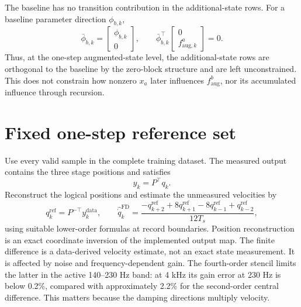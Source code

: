 \documentclass[11pt,a4paper]{article}
\begin{document}
The baseline has no transition contribution in the additional-state rows.
For a baseline parameter direction \(\phi_{b,k}\),
\begin{equation}
    \bar\phi_{b,k}=\begin{bmatrix}\phi_{b,k}\\0\end{bmatrix},
    \qquad
    \bar\phi_{b,k}^{\top}
    \begin{bmatrix}0\\f_{\mathrm{aug},k}^a\end{bmatrix}=0.
    \label{eq:zero-block}
\end{equation}
Thus, at the one-step augmented-state level, the additional-state rows are
orthogonal to the baseline by the zero-block structure and are left
unconstrained. This does not constrain how nonzero \(x_a\) later influences
\(f_{\mathrm{aug}}^b\), nor its accumulated influence through recursion.

\section{Fixed one-step reference set}
\label{sec:fixed-reference-set}

Use every valid sample in the complete training dataset. The measured output
contains the three stage positions and satisfies
\begin{equation}
    y_k=P^\top q_k.
\end{equation}
Reconstruct the logical positions and estimate the unmeasured velocities by
\begin{equation}
    q_k^{\mathrm{ref}}=P^{-\top}y_k^{\mathrm{data}},
    \qquad
    \widehat{\dot q}_k^{\mathrm{FD}}
    =\frac{-q_{k+2}^{\mathrm{ref}}+8q_{k+1}^{\mathrm{ref}}
            -8q_{k-1}^{\mathrm{ref}}+q_{k-2}^{\mathrm{ref}}}{12T_s},
    \label{eq:reference-reconstruction}
\end{equation}
using suitable lower-order formulas at record boundaries. Position
reconstruction is an exact coordinate inversion of the implemented output
map. The finite difference is a data-derived velocity estimate, not an exact
state measurement. It is affected by noise and frequency-dependent gain. The
fourth-order stencil limits the latter in the active 140--230 Hz band: at
4 kHz its gain error at 230 Hz is below 0.2\%, compared with approximately
2.2\% for the second-order central difference. This matters because the
damping directions multiply velocity.
\end{document}
